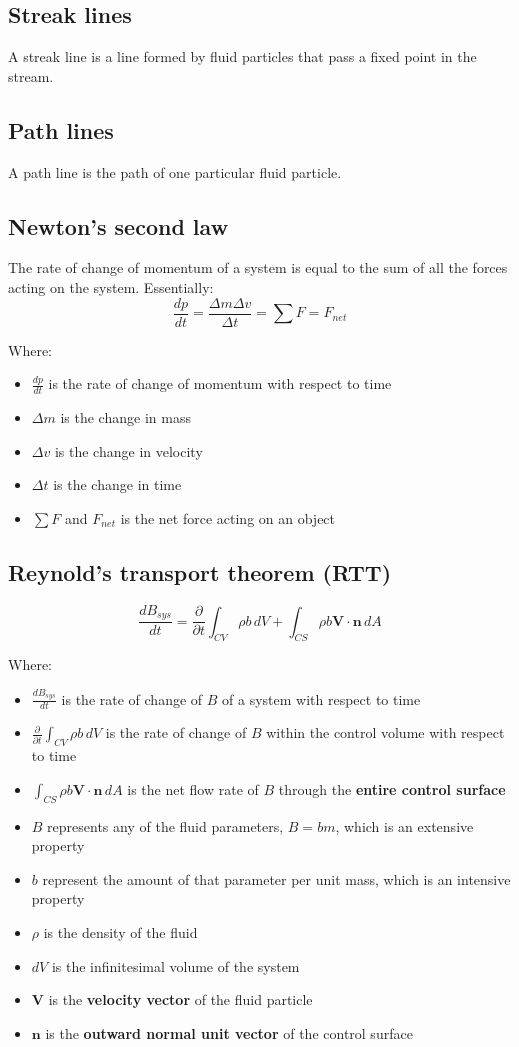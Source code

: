 \documentclass[11pt]{article}
\begin{document}
\subsection{Streak lines}
\label{sec:orgd7c582f}
A streak line is a line formed by fluid particles that pass a fixed point in the stream.
\subsection{Path lines}
\label{sec:org3b00a9d}
A path line is the path of one particular fluid particle.
\subsection{Newton's second law}
\label{sec:org3ba64b9}
The rate of change of momentum of a system is equal to the sum of all the forces acting on the system. Essentially:
\[\frac{dp}{dt} = \frac{\Delta m \Delta v}{\Delta t} = \sum F = F_{net}\]

Where:
\begin{itemize}
\item \(\frac{dp}{dt}\) is the rate of change of momentum with respect to time
\item \(\Delta m\) is the change in mass
\item \(\Delta v\) is the change in velocity
\item \(\Delta t\) is the change in time
\item \(\sum F\) and \(F_{net}\) is the net force acting on an object
\end{itemize}
\subsection{Reynold's transport theorem (RTT)}
\label{sec:orgf646a52}
\[\frac{dB_{sys}}{dt} = \frac{\partial}{\partial t} \int_{CV} \rho b \, dV + \int_{CS} \rho b \boldsymbol{V} \cdot \boldsymbol{n} \, dA\]

Where:
\begin{itemize}
\item \(\frac{dB_{sys}}{dt}\) is the rate of change of \(B\) of a system with respect to time
\item \(\frac{\partial}{\partial t} \int_{CV} \rho b \, dV\) is the rate of change of \(B\) within the control volume with respect to time
\item \(\int_{CS} \rho b \boldsymbol{V} \cdot \boldsymbol{n} \, dA\) is the net flow rate of \(B\) through the \textbf{entire control surface}
\item \(B\) represents any of the fluid parameters, \(B = bm\), which is an extensive property
\item \(b\) represent the amount of that parameter per unit mass, which is an intensive property
\item \(\rho\) is the density of the fluid
\item \(dV\) is the infinitesimal volume of the system
\item \(\boldsymbol{V}\) is the \textbf{velocity vector} of the fluid particle
\item \(\boldsymbol{n}\) is the \textbf{outward normal unit vector} of the control surface
\end{itemize}
\end{document}
